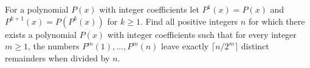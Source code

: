 For a polynomial $P(x)$ with integer coefficients let $P^1(x) = P(x)$ and $P^{k+1}(x) = P(P^k(x))$ for $k \geq 1$. Find all positive integers $n$ for which there exists a polynomial $P(x)$ with integer coefficients such that for every integer $m \geq 1$, the numbers $P^m(1), \ldots, P^m(n)$ leave exactly $\lceil n/2^m \rceil$ distinct remainders when divided by $n$.
